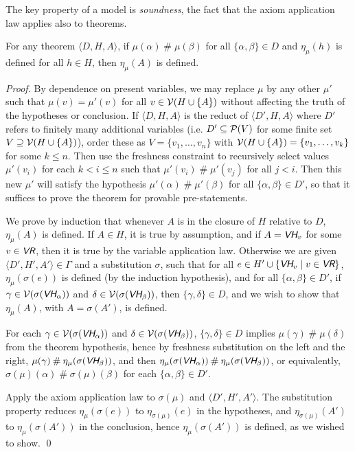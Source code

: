 \documentclass[runningheads,a4paper]{llncs}
\newcommand{\vr}{\textit{\textsf{VR}}} %
\newcommand{\vh}{\textit{\textsf{VH}}} %
\newcommand{\ang}[1]{\langle#1\rangle}
\newcommand{\fresh}{\mathbin{\#}}
\begin{document}
The key property of a model is {\em soundness}, the fact that the axiom application law applies also to theorems.
\begin{theorem}\label{thm:sound}
For any theorem $\ang{D,H,A}$, if $\mu(\alpha)\fresh\mu(\beta)$ for all $\{\alpha,\beta\}\in D$ and $\eta_\mu(h)$ is defined for all $h\in H$, then $\eta_\mu(A)$ is defined.
\end{theorem}
\begin{proof}
By dependence on present variables, we may replace $\mu$ by any other $\mu'$ such that $\mu(v)=\mu'(v)$ for all $v\in{\cal V}(H\cup\{A\})$ without affecting the truth of the hypotheses or conclusion. If $\ang{D,H,A}$ is the reduct of $\ang{D',H,A}$ where $D'$ refers to finitely many additional variables (i.e. $D'\subseteq{\cal P}(V)$ for some finite set $V\supseteq{\cal V}(H\cup\{A\})$), order these as $V=\{v_1,\dots,v_n\}$ with ${\cal V}(H\cup\{A\})=\{v_1,\dots,v_k\}$ for some $k\le n$. Then use the freshness constraint to recursively select values $\mu'(v_i)$ for each $k<i\le n$ such that $\mu'(v_i)\fresh \mu'(v_j)$ for all $j<i$. Then this new $\mu'$ will satisfy the hypothesis $\mu'(\alpha)\fresh\mu'(\beta)$ for all $\{\alpha,\beta\}\in D'$, so that it suffices to prove the theorem for provable pre-statements.

We prove by induction that whenever $A$ is in the closure of $H$ relative to $D$, $\eta_\mu(A)$ is defined. If $A\in H$, it is true by assumption, and if $A=\vh_v$ for some $v\in\vr$, then it is true by the variable application law. Otherwise we are given $\ang{D',H',A'}\in\Gamma$ and a substitution $\sigma$, such that for all $e\in H'\cup\{\vh_v\mid v\in\vr\}$, $\eta_\mu(\sigma(e))$ is defined (by the induction hypothesis), and for all $\{\alpha,\beta\}\in D'$, if $\gamma\in{\cal V}(\sigma(\vh_\alpha))$ and $\delta\in{\cal V}(\sigma(\vh_\beta))$, then $\{\gamma,\delta\}\in D$, and we wish to show that $\eta_\mu(A)$, with $A=\sigma(A')$, is defined.

For each $\gamma\in{\cal V}(\sigma(\vh_\alpha))$ and $\delta\in{\cal V}(\sigma(\vh_\beta))$, $\{\gamma,\delta\}\in D$ implies $\mu(\gamma)\fresh\mu(\delta)$ from the theorem hypothesis, hence by freshness substitution on the left and the right, $\mu(\gamma)\fresh\eta_\mu(\sigma(\vh_\beta))$, and then  $\eta_\mu(\sigma(\vh_\alpha))\fresh\eta_\mu(\sigma(\vh_\beta))$, or equivalently, $\sigma(\mu)(\alpha)\fresh\sigma(\mu)(\beta)$ for each $\{\alpha,\beta\}\in D'$.

Apply the axiom application law to $\sigma(\mu)$ and $\ang{D',H',A'}$. The substitution property reduces $\eta_\mu(\sigma(e))$ to $\eta_{\sigma(\mu)}(e)$ in the hypotheses, and $\eta_{\sigma(\mu)}(A')$ to $\eta_\mu(\sigma(A'))$ in the conclusion, hence $\eta_\mu(\sigma(A'))$ is defined, as we wished to show.
\qed\end{proof}
\end{document}
